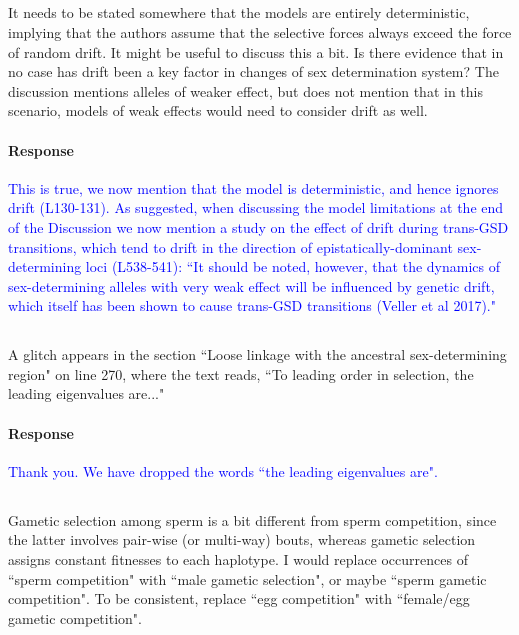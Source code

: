 \documentclass[10pt,letterpaper]{article}
\begin{document}
\noindent\subsection{}
It needs to be stated somewhere that the models are entirely deterministic, implying that the authors assume that the selective forces always exceed the force of random drift. It might be useful to discuss this a bit. Is there evidence that in no case has drift been a key factor in changes of sex determination system?  The discussion mentions alleles of weaker effect, but does not mention that in this scenario, models of weak effects would need to consider drift as well.

\noindent\paragraph{Response}
\textcolor{blue}{
This is true, we now mention that the model is deterministic, and hence ignores drift (L130-131). 
As suggested, when discussing the model limitations at the end of the Discussion we now mention a study on the effect of drift during trans-GSD transitions, which tend to drift in the direction of epistatically-dominant sex-determining loci (L538-541): ``It should be noted, however, that the dynamics of sex-determining alleles with very weak effect will be influenced by genetic drift, which itself has been shown to cause trans-GSD transitions (Veller et al 2017)."}

\noindent\subsection{}
A glitch appears in the section ``Loose linkage with the ancestral sex-determining region" on line 270, where the text reads, ``To leading order in selection, the leading eigenvalues are..."

\noindent\paragraph{Response}
\textcolor{blue}{Thank you. We have dropped the words ``the leading eigenvalues are".}

\noindent\subsection{}
Gametic selection among sperm is a bit different from sperm competition, since the latter involves pair-wise (or multi-way) bouts, whereas gametic selection assigns constant fitnesses to each haplotype. I would replace occurrences of ``sperm competition" with ``male gametic selection", or maybe ``sperm gametic competition". To be consistent, replace ``egg competition" with ``female/egg gametic competition". 
\end{document}
